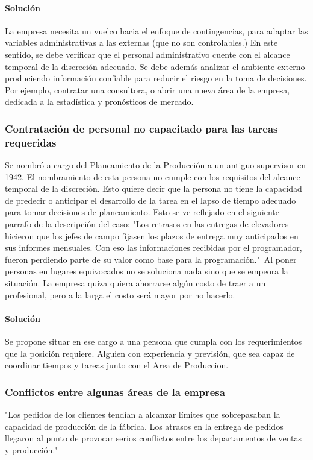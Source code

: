 \paragraph{Soluci\'on}
La empresa necesita un vuelco hacia el enfoque de contingencias, para adaptar las variables administrativas a las externas (que no son controlables.) En este sentido, se debe verificar que el personal administrativo cuente con el alcance temporal de la discreci\'on adecuado. Se debe adem\'{a}s analizar el ambiente externo produciendo informaci\'on confiable para reducir el riesgo en la toma de decisiones. Por ejemplo, contratar una consultora, o abrir una nueva \'area de la empresa, dedicada a la estad\'istica y pron\'osticos de mercado.

\subsubsection{Contrataci\'on de personal no capacitado para las tareas requeridas}
Se nombr\'o a cargo del Planeamiento de la Producci\'on a un antiguo supervisor en 1942. El nombramiento de esta persona no cumple con los requisitos del alcance temporal de la discreci\'on. Esto quiere decir que la persona no tiene la capacidad de predecir o anticipar el desarrollo de la tarea en el lapso de tiempo adecuado para tomar decisiones de planeamiento. Esto se ve reflejado en el siguiente parrafo de la descripci\'on del caso: "Los retrasos en las entregas de elevadores hicieron que los jefes de campo fijasen los plazos de entrega muy anticipados en sus informes mensuales. Con eso las informaciones recibidas por el programador, fueron perdiendo parte de su valor como base para la programaci\'on."\ Al poner personas en lugares equivocados no se soluciona nada sino que se empeora la situaci\'on. La empresa quiza quiera ahorrarse alg\'un costo de traer a un profesional, pero a la larga el costo ser\'a mayor por no hacerlo.
\paragraph{Soluci\'on}
Se propone situar en ese cargo a una persona que cumpla con los requerimientos que la posici\'on requiere. Alguien con experiencia y previsi\'on, que sea capaz de coordinar tiempos y tareas junto con el Area de Produccion.

\subsubsection{Conflictos entre algunas \'areas de la empresa}
"Los pedidos de los clientes tend\'ian a alcanzar l\'imites que sobrepasaban la capacidad de producci\'on de la f\'abrica. Los atrasos en la entrega de pedidos llegaron al punto de provocar serios conflictos entre los departamentos de ventas y producci\'on."
